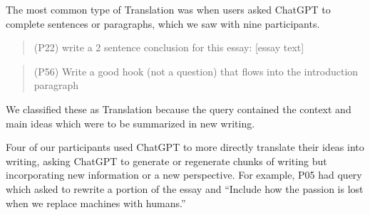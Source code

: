 \documentclass[manuscript,screen,acmsmall]{acmart}
\begin{document}
        The most common type of Translation was when users asked ChatGPT to complete sentences or paragraphs, which we saw with nine participants.
        \begin{quote}
            (P22) write a 2 sentence conclusion for this essay: [essay text]
        \end{quote}
        \begin{quote}
             (P56) Write a good hook (not a question) that flows into the introduction paragraph
        \end{quote}
        We classified these as Translation because the query contained the context and main ideas which were to be summarized in new writing.

        Four of our participants used ChatGPT to more directly translate their ideas into writing, asking ChatGPT to generate or regenerate chunks of writing but incorporating new information or a new perspective.
        For example, P05 had query which asked to rewrite a portion of the essay and ``Include how the passion is lost when we replace machines with humans.''


        
\end{document}
